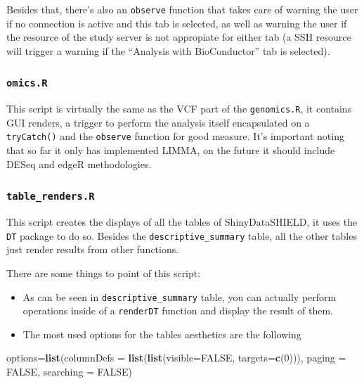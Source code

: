 \documentclass[
]{book}
\newenvironment{Shaded}{\begin{snugshade}}{\end{snugshade}}
\newcommand{\DataTypeTok}[1]{\textcolor[rgb]{0.13,0.29,0.53}{#1}}
\newcommand{\DecValTok}[1]{\textcolor[rgb]{0.00,0.00,0.81}{#1}}
\newcommand{\KeywordTok}[1]{\textcolor[rgb]{0.13,0.29,0.53}{\textbf{#1}}}
\newcommand{\NormalTok}[1]{#1}
\newcommand{\OtherTok}[1]{\textcolor[rgb]{0.56,0.35,0.01}{#1}}
\providecommand{\tightlist}{%
  \setlength{\itemsep}{0pt}\setlength{\parskip}{0pt}}
\begin{document}
Besides that, there's also an \texttt{observe} function that takes care of warning the user if no connection is active and this tab is selected, as well as warning the user if the resource of the study server is not appropiate for either tab (a SSH resource will trigger a warning if the ``Analysis with BioConductor'' tab is selected).

\hypertarget{omics.r}{%
\subsubsection{\texorpdfstring{\texttt{omics.R}}{omics.R}}\label{omics.r}}

This script is virtually the same as the VCF part of the \texttt{genomics.R}, it contains GUI renders, a trigger to perform the analysis itself encapsulated on a \texttt{tryCatch()} and the \texttt{observe} function for good measure. It's important noting that so far it only has implemented LIMMA, on the future it should include DESeq and edgeR methodologies.

\hypertarget{table_renders.r}{%
\subsubsection{\texorpdfstring{\texttt{table\_renders.R}}{table\_renders.R}}\label{table_renders.r}}

This script creates the displays of all the tables of ShinyDataSHIELD, it uses the \texttt{DT} package to do so. Besides the \texttt{descriptive\_summary} table, all the other tables just render results from other functions.

There are some things to point of this script:

\begin{itemize}
\tightlist
\item
  As can be seen in \texttt{descriptive\_summary} table, you can actually perform operations inside of a \texttt{renderDT} function and display the result of them.
\item
  The most used options for the tables aesthetics are the following
\end{itemize}

\begin{Shaded}
\begin{Highlighting}[]
\NormalTok{options=}\KeywordTok{list}\NormalTok{(}\DataTypeTok{columnDefs =} \KeywordTok{list}\NormalTok{(}\KeywordTok{list}\NormalTok{(}\DataTypeTok{visible=}\OtherTok{FALSE}\NormalTok{, }\DataTypeTok{targets=}\KeywordTok{c}\NormalTok{(}\DecValTok{0}\NormalTok{))),}
                                          \DataTypeTok{paging =} \OtherTok{FALSE}\NormalTok{, }\DataTypeTok{searching =} \OtherTok{FALSE}\NormalTok{)}
\end{Highlighting}
\end{Shaded}
\end{document}

